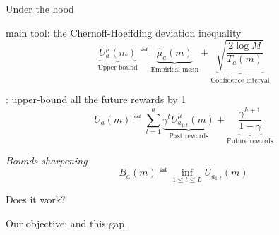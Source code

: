 \documentclass{beamer}
\begin{document}
\begin{frame}{Under the hood}
    \begin{block}{\OLOP main tool: the Chernoff-Hoeffding deviation inequality}
        \begin{equation*}
             \underbrace{U^{\mu}_a(m)}_{\text{Upper bound}} \eqdef \underbrace{\hat{\mu}_a(m)}_{\text{Empirical mean}} + \underbrace{\sqrt{\frac{2 \log M}{T_a(m)}}}_{\text{Confidence interval}}
        \end{equation*}
    \end{block}
    \pause
    
    \begin{block}{\OPD: upper-bound all the future rewards by 1}
    \begin{equation*}
    \label{eq:Ua}
        U_a(m) \eqdef \sum_{t=1}^h \underbrace{\gamma^t U^{\mu}_{a_{1:t}}(m)}_{\text{Past rewards}} + \underbrace{\frac{\gamma^{h+1}}{1-\gamma}}_{\text{Future rewards}}
    \end{equation*}
    \end{block}
    \pause
    
    \begin{block}{\emph{Bounds sharpening}}
    \begin{equation*}
    \label{eq:Ba}
        B_a(m) \eqdef \inf_{1 \leq t \leq L} U_{a_{1:t}}(m)
    \end{equation*}
    \end{block}
\end{frame}

\begin{frame}{Does it work?}
\begin{center}
    
    Our objective:  and  this gap.
\end{center}
\end{frame}
\end{document}
